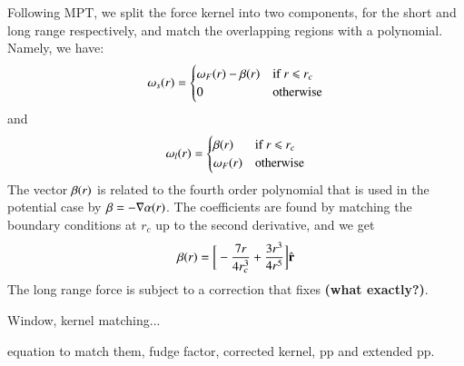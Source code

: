 Following MPT, we split  the force kernel into two components, for the short and long range respectively, and 
match the overlapping regions with a polynomial. Namely, we have:
\begin{eqnarray}
{\bf \omega}_{s}(r) = \begin{cases} {\bf \omega}_{F}(r) -  {\bf \beta}(r) &\mbox{if  } \mbox{$r$ $\le$ $r_{c}$ } \\
0 & \mbox{otherwise} 
\end{cases}
\end{eqnarray}
and
\begin{eqnarray}
{\bf \omega}_{l}(r) = \begin{cases} {\bf \beta}(r) &\mbox{if  } \mbox{$r$ $\le$ $r_{c}$ } \\
 {\bf\omega}_{F}(r)  &\mbox{otherwise} 
\end{cases}
\end{eqnarray}
The vector $ {\bf \beta}(r)$ is related to the fourth order polynomial that is used in the potential case by
 $ {\bf \beta} = - {\bf \nabla} \alpha(r)$. The coefficients are found by matching the boundary conditions at $r_{c}$ up to the second derivative,
 and we get
  \begin{eqnarray}
   {\bf \beta}(r) = \bigg[ -\frac{7 r}{4 r_{c}^{3}} + \frac{3 r^{3}}{4 r^{5}}\bigg] \hat{\bf r}
  \end{eqnarray}
The long range force is subject to a correction that fixes {\bf (what exactly?)}.

Window, kernel matching...

 equation to match them, fudge factor,
corrected kernel, pp and extended pp.
